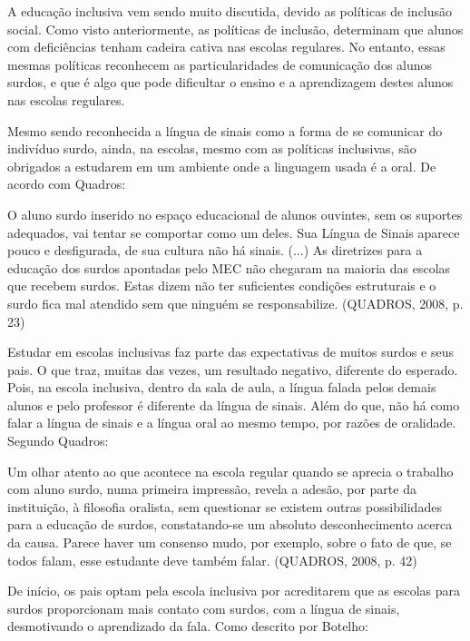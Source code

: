 \documentclass[brasil]{abnt}
\begin{document}
	A educação inclusiva vem sendo muito discutida, devido as políticas de inclusão social. Como visto anteriormente, as políticas de inclusão, determinam que alunos com deficiências tenham cadeira cativa 
	nas escolas regulares. No entanto, essas mesmas políticas reconhecem as particularidades de comunicação dos alunos surdos, e que é algo que pode dificultar o ensino e a aprendizagem destes alunos nas 
	escolas regulares.
	
	Mesmo sendo reconhecida a língua de sinais como a forma de se comunicar do indivíduo surdo, ainda, na escolas, mesmo com as políticas inclusivas, são obrigados a estudarem em um ambiente onde
	a linguagem usada é a oral. De acordo com Quadros:
					
		\begin{citacao}O aluno surdo inserido no espaço educacional de alunos ouvintes, sem os suportes adequados, vai tentar se comportar como um deles. Sua Língua de Sinais aparece pouco e desfigurada, 
						de sua cultura não há sinais. (...) As diretrizes para a educação dos surdos apontadas pelo MEC não chegaram na maioria das escolas que recebem surdos. Estas dizem não ter suficientes 
						condições estruturais e o surdo fica mal atendido sem que ninguém se responsabilize. (QUADROS, 2008, p. 23)
		\end{citacao}
		
			
	Estudar em escolas inclusivas faz parte das expectativas de muitos surdos e seus pais. O que traz, muitas das vezes, um resultado negativo, diferente do esperado.
	Pois, na escola inclusiva, dentro da sala de aula, a língua falada pelos demais alunos e pelo professor é diferente da língua de sinais. Além do que, não há como falar
	a língua de sinais e a língua oral ao mesmo tempo, por razões de oralidade. Segundo Quadros:
	
		\begin{citacao} Um olhar atento ao que acontece na escola regular quando se aprecia o trabalho com aluno surdo, numa primeira impressão, revela a adesão, por parte
						da instituição, à filosofia oralista, sem questionar se existem outras possibilidades para a educação de surdos, constatando-se um absoluto 
						desconhecimento acerca da causa. Parece haver um consenso mudo, por exemplo, sobre o fato de que, se todos falam, esse estudante deve também falar.
						(QUADROS, 2008, p. 42)
		\end{citacao}
	
	De início, os pais optam pela escola inclusiva por acreditarem que as escolas para surdos proporcionam mais contato com surdos, com a língua de sinais, desmotivando o
	aprendizado da fala. Como descrito por Botelho:
	
\end{document}
